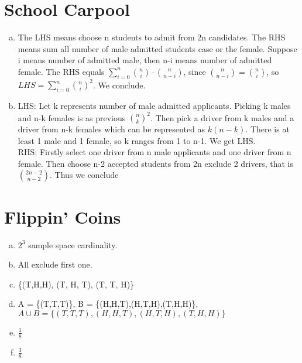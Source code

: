 \documentclass{article}
\begin{document}
\part*{School Carpool}
\begin{enumerate}[(a)]
    \item The LHS means choose n students to admit from 2n candidates. 
    The RHS means sum all number of male admitted students case or the female. 
    Suppose i means number of admitted male, then n-i means number of admitted female. 
    The RHS equals $\sum_{i=0}^{n} \binom{n}{i} \cdot \binom{n}{n-i}$, 
    since $\binom{n}{n-i} = \binom{n}{i}$, so $LHS = \sum_{i=0}^{n} \binom{n}{i}^2$. 
    We conclude.

    \item LHS: Let k represents number of male admitted applicants. 
    Picking k males and n-k females is as previous $\binom{n}{k}^2$. 
    Then pick a driver from k males and a driver from n-k females which can be represented as $k(n-k)$. 
    There is at least 1 male and 1 female, so k ranges from 1 to n-1. We get LHS. \\

    RHS: Firstly select one driver from n male applicants and one driver from n female. 
    Then choose n-2 accepted students from 2n exclude 2 drivers, that is $\binom{2n-2}{n-2}$. 
    Thus we conclude
\end{enumerate}

\part*{Flippin' Coins}
\begin{enumerate}[(a)]
    \item $2^3$ sample space cardinality.
    \item All exclude first one.
    \item \{(T,H,H), (T, H, T), (T, T, H)\}
    \item A = \{(T,T,T)\}, B = \{(H,H,T),(H,T,H),(T,H,H)\}, $A \cup B = \{(T,T,T),(H,H,T),(H,T,H),(T,H,H)\}$
    \item $\frac{1}{8}$
    \item $\frac{3}{8}$
\end{enumerate}
\end{document}
